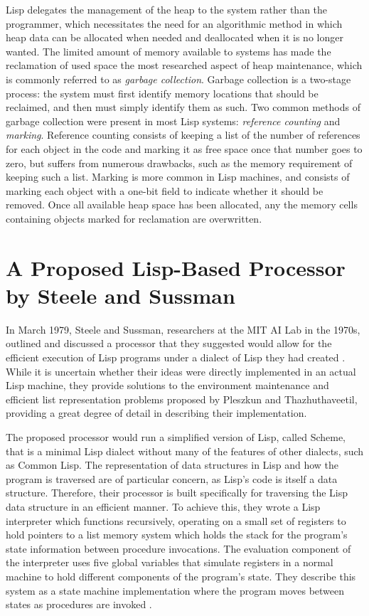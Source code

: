 \documentclass[journal]{IEEEtran}
\begin{document}
Lisp delegates the management of the heap to the system rather than the programmer, which necessitates the need for an algorithmic method in which heap data can be allocated when needed and deallocated when it is no longer wanted. The limited amount of memory available to systems has made the reclamation of used space the most researched aspect of heap maintenance, which is commonly referred to as \textit{garbage collection}. Garbage collection is a two-stage process: the system must first identify memory locations that should be reclaimed, and then must simply identify them as such. Two common methods of garbage collection were present in most Lisp systems: \textit{reference counting} and \textit{marking}. Reference counting consists of keeping a list of the number of references for each object in the code and marking it as free space once that number goes to zero, but suffers from numerous drawbacks, such as the memory requirement of keeping such a list. Marking is more common in Lisp machines, and consists of marking each object with a one-bit field to indicate whether it should be removed. Once all available heap space has been allocated, any the memory cells containing objects marked for reclamation are overwritten.

\section{A Proposed Lisp-Based Processor by Steele and Sussman}
In March 1979, Steele and Sussman, researchers at the MIT AI Lab in the 1970s, outlined and discussed a processor that they suggested would allow for the efficient execution of Lisp programs under a dialect of Lisp they had created \cite{ss}. While it is uncertain whether their ideas were directly implemented in an actual Lisp machine, they provide solutions to the environment maintenance and efficient list representation problems proposed by Pleszkun and Thazhuthaveetil, providing a great degree of detail in describing their implementation.

The proposed processor would run a simplified version of Lisp, called Scheme, that is a minimal Lisp dialect without many of the features of other dialects, such as Common Lisp. The representation of data structures in Lisp and how the program is traversed are of particular concern, as Lisp's code is itself a data structure. Therefore, their processor is built specifically for traversing the Lisp data structure in an efficient manner. To achieve this, they wrote a Lisp interpreter which functions recursively, operating on a small set of registers to hold pointers to a list memory system which holds the stack for the program's state information between procedure invocations. The evaluation component of the interpreter uses five global variables that simulate registers in a normal machine to hold different components of the program's state. They describe this system as a state machine implementation where the program moves between states as procedures are invoked \cite{ss}.
\end{document}
